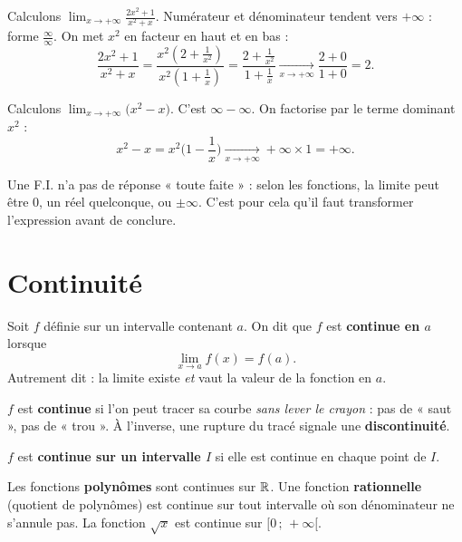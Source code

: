 \begin{exemple}
Calculons $\displaystyle\lim_{x\to +\infty}\frac{2x^2+1}{x^2+x}$. Numérateur et
dénominateur tendent vers $+\infty$ : forme $\frac{\infty}{\infty}$. On met $x^2$ en
facteur en haut et en bas :
\[ \frac{2x^2+1}{x^2+x}=\frac{x^2\!\left(2+\frac1{x^2}\right)}{x^2\!\left(1+\frac1x\right)}
   =\frac{2+\frac1{x^2}}{1+\frac1x}\xrightarrow[x\to+\infty]{}\frac{2+0}{1+0}=2. \]
\end{exemple}

\begin{exemple}
Calculons $\displaystyle\lim_{x\to +\infty}\big(x^2-x\big)$. C'est $\infty-\infty$.
On factorise par le terme dominant $x^2$ :
\[ x^2-x=x^2\Big(1-\frac1x\Big)\xrightarrow[x\to+\infty]{}+\infty\times 1=+\infty. \]
\end{exemple}

\begin{remarque}
Une F.I. n'a pas de réponse « toute faite » : selon les fonctions, la limite peut
être $0$, un réel quelconque, ou $\pm\infty$. C'est pour cela qu'il faut transformer
l'expression avant de conclure.
\end{remarque}

\section{Continuité}

\begin{definition}
Soit $f$ définie sur un intervalle contenant $a$. On dit que $f$ est \textbf{continue
en $a$} lorsque
\[ \lim_{x\to a}f(x)=f(a). \]
Autrement dit : la limite existe \emph{et} vaut la valeur de la fonction en $a$.
\end{definition}

\begin{aretenir}
$f$ est \textbf{continue} si l'on peut tracer sa courbe \emph{sans lever le crayon} :
pas de « saut », pas de « trou ». À l'inverse, une rupture du tracé signale une
\textbf{discontinuité}.
\end{aretenir}

\begin{definition}
$f$ est \textbf{continue sur un intervalle $I$} si elle est continue en chaque point
de $I$.
\end{definition}

\begin{propriete}
Les fonctions \textbf{polynômes} sont continues sur $\mathbb{R}$. Une fonction
\textbf{rationnelle} (quotient de polynômes) est continue sur tout intervalle où son
dénominateur ne s'annule pas. La fonction $\sqrt{x}$ est continue sur $[0\,;\,+\infty[$.
\end{propriete}

